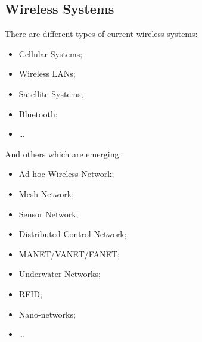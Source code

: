 \subsection{Wireless Systems}
There are different types of current wireless systems:
\begin{itemize}
    \item Cellular Systems;
    \item Wireless LANs;
    \item Satellite Systems;
    \item Bluetooth;
    \item \dots
\end{itemize}
And others which are emerging:
\begin{itemize}
    \item Ad hoc Wireless Network;
    \item Mesh Network;
    \item Sensor Network;
    \item Distributed Control Network;
    \item MANET/VANET/FANET;
    \item Underwater Networks;
    \item RFID;
    \item Nano-networks;
    \item \dots
\end{itemize}

